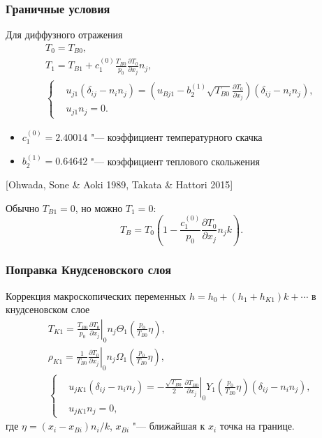 \documentclass[mathserif]{beamer} %
\newcommand{\pder}[2][]{\frac{\partial#1}{\partial#2}}
\begin{document}
\begin{frame}
    \frametitle{Граничные условия}
    Для диффузного отражения
    \begin{gather}
        T_0 = T_{B0}, \label{eq:bc_T0} \\
        T_1 = T_{B1} + c_1^{(0)}\frac{T_{B0}}{p_0}\pder[T_0]{x_j} n_j, \label{eq:bc_T1} \\
        \left\{
        \begin{aligned}
            & u_{j1} (\delta_{ij}-n_in_j) =
                \left(u_{Bj1} - b_2^{(1)} \sqrt{T_{B0}} \pder[T_0]{x_j}\right) (\delta_{ij}-n_in_j), \\
            & u_{j1} n_j = 0.
        \end{aligned}
        \right. \label{eq:bc_u1}
    \end{gather}
    \vspace{-10pt}
    \begin{itemize}
        \item \(c_1^{(0)} = 2.40014\) "--- коэффициент температурного скачка
        \item \(b_2^{(1)} = 0.64642\) "--- коэффициент теплового скольжения
    \end{itemize}

    \vspace{-5pt}
    [Ohwada, Sone \& Aoki 1989, Takata \& Hattori 2015]
    \vspace{2pt}\pause

    Обычно \(T_{B1}=0\), но можно \(T_1=0\):
    \begin{equation}\label{eq:boundary_temp}
        T_B = T_0 \left( 1 - \frac{c_1^{(0)}}{p_0}\pder[T_0]{x_j}n_j k \right).
    \end{equation}
\end{frame}

\begin{frame}
    \frametitle{Поправка Кнудсеновского слоя}
    Коррекция макроскопических переменных \(h = h_0 + (h_1 + h_{K1})k + \cdots\) в кнудсеновском слое
    \begin{gather}
        T_{K1} = \frac{T_{B0}}{p_0}\left.\pder[T_0]{x_j}\right|_0 n_j
            \Theta_1\left(\frac{p_0}{T_{B0}}\eta\right), \label{eq:correction_T} \\
        \rho_{K1} = \frac1{T_{B0}}\left.\pder[T_0]{x_j}\right|_0 n_j
            \Omega_1\left(\frac{p_0}{T_{B0}}\eta\right), \label{eq:correction_rho} \\
        \left\{
        \begin{aligned}
            & u_{jK1} (\delta_{ij}-n_in_j) =
                -\frac{\sqrt{T_{B0}}}2 \left.\pder[T_{B0}]{x_j}\right|_0
                Y_1\left(\frac{p_0}{T_{B0}}\eta\right) (\delta_{ij}-n_in_j), \\
            & u_{jK1} n_j = 0,
        \end{aligned}
        \right. \label{eq:correction_u}
    \end{gather}
    где \(\eta = (x_i-x_{Bi})n_i/k\), \(x_{Bi}\) "--- ближайшая к \(x_i\) точка на границе.
\end{frame}
\end{document}

